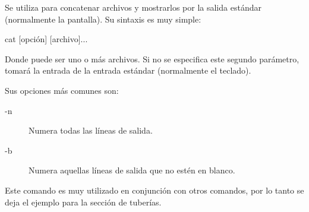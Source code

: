 \autor{\LDP}
\colaborador{}
\revisor{\LLC}
\traductor{}

Se utiliza para concatenar archivos y mostrarlos por la salida
est\'andar (normalmente la pantalla). Su sintaxis es muy simple:

\begin{vscreen}
cat [opci\'on] [archivo]...
\end{vscreen}

Donde  puede ser uno o m\'as archivos. Si no se
especifica este segundo par\'ametro,  tomar\'a la entrada
de la entrada est\'andar (normalmente el teclado).

Sus opciones m\'as comunes son:

\begin{description}
\item[-n] Numera todas las l\'ineas de salida.
\item[-b] Numera aquellas l\'ineas de salida que no est\'en en blanco.
\end{description}

Este comando es muy utilizado en conjunci\'on con otros comandos, por
lo tanto se deja el ejemplo para la secci\'on de tuber\'ias.


